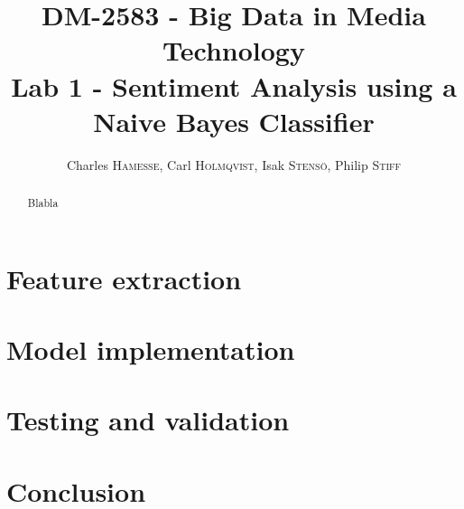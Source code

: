 \documentclass[a4paper,10pt]{article}
\title{DM-2583 - Big Data in Media Technology\\Lab 1 - Sentiment Analysis using a Naive Bayes Classifier}
\date{\vspace{-5ex}
Charles \textsc{Hamesse},
Carl \textsc{Holmqvist},
Isak \textsc{Stensö},
Philip \textsc{Stiff}
}
\begin{document}
\maketitle
\begin{abstract}
    Blabla
    \vspace{2ex}
\end{abstract}
\section{Feature extraction}
\section{Model implementation}
\section{Testing and validation}
\section{Conclusion}
	
	
\end{document}

